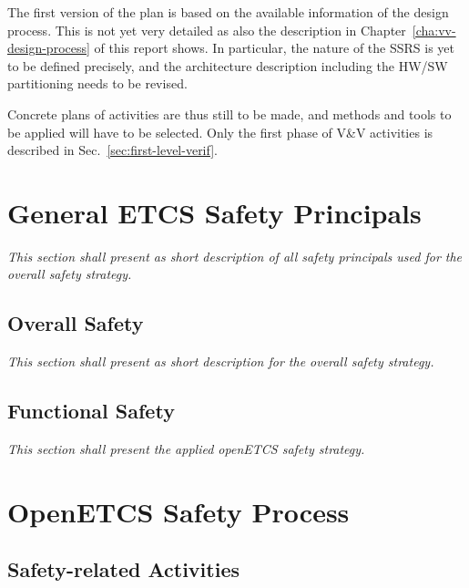 \documentclass{template/openetcs_report}
\begin{document}
The first version of the plan is based on the available information of
the design process. This is not yet very detailed as also the
description in Chapter~\ref{cha:vv-design-process} of this report
shows. In particular, the nature of the SSRS is yet to be defined
precisely, and the architecture description including the HW/SW
partitioning needs to be revised.

Concrete plans of activities are thus still to be made, and methods
and tools to be applied will have to be selected. Only the first phase
of V\&V activities is described in Sec.~\ref{sec:first-level-verif}.





\chapter{General ETCS Safety Principals}

\textit{This section shall present as short description of all safety principals used for the overall safety strategy.}

\section{Overall Safety}

\textit{This section shall present as short description for the overall safety strategy.}

\section{Functional Safety}

\textit{This section shall present the applied openETCS safety strategy.}





\chapter{OpenETCS Safety Process}






\section{Safety-related Activities}
\end{document}
